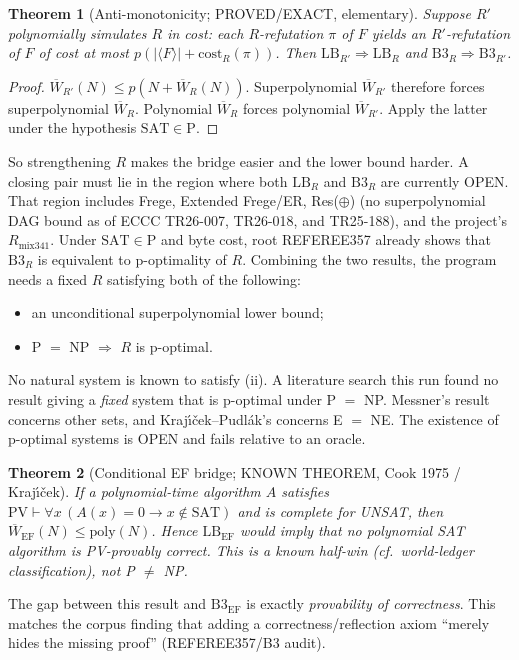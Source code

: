 \documentclass[11pt]{article}
\newtheorem{theorem}{Theorem}
\begin{document}
\begin{theorem}[Anti-monotonicity; PROVED/EXACT, elementary]
Suppose $R'$ polynomially simulates $R$ \emph{in cost}: each $R$-refutation
$\pi$ of $F$ yields an $R'$-refutation of $F$ of cost at most
$p(|\langle F\rangle|+\mathrm{cost}_R(\pi))$. Then
$\mathrm{LB}_{R'}\Rightarrow\mathrm{LB}_R$ and $\mathrm{B3}_R\Rightarrow\mathrm{B3}_{R'}$.
\end{theorem}
\begin{proof}
$\overline W_{R'}(N)\le p(N+\overline W_R(N))$. Superpolynomial $\overline W_{R'}$ therefore forces
superpolynomial $\overline W_R$. Polynomial $\overline W_R$ forces polynomial $\overline W_{R'}$.
Apply the latter under the hypothesis $\mathrm{SAT}\in\mathrm P$.
\end{proof}
\noindent So strengthening $R$ makes the bridge easier and the lower bound harder.
A closing pair must lie in the region where both $\mathrm{LB}_R$ and $\mathrm{B3}_R$ are
currently OPEN. That region includes Frege, Extended Frege/ER, Res($\oplus$)
(no superpolynomial DAG bound as of ECCC TR26-007, TR26-018, and TR25-188), and the
project's $R_{\mathrm{mix341}}$. Under $\mathrm{SAT}\in\mathrm P$ and byte cost,
root REFEREE357 already shows that $\mathrm{B3}_R$ is equivalent to p-optimality of $R$.
Combining the two results, the program needs a fixed $R$ satisfying both of the following:
\begin{itemize}
\item[(i)] an unconditional superpolynomial lower bound;
\item[(ii)] P $=$ NP $\Rightarrow$ $R$ is p-optimal.
\end{itemize}
No natural system is known to satisfy (ii). A literature search this run found no
result giving a \emph{fixed} system that is p-optimal under P $=$ NP. Messner's
result concerns other sets, and Kraj\'\i\v{c}ek--Pudl\'ak's concerns E $=$ NE. The
existence of p-optimal systems is OPEN and fails relative to an oracle.

\begin{theorem}[Conditional EF bridge; KNOWN THEOREM, Cook 1975 / Kraj\'\i\v{c}ek]
If a polynomial-time algorithm $A$ satisfies
$\mathrm{PV}\vdash\forall x\,(A(x)=0\rightarrow x\notin\mathrm{SAT})$ and is complete
for UNSAT, then $\overline W_{\mathrm{EF}}(N)\le\mathrm{poly}(N)$. Hence
$\mathrm{LB}_{\mathrm{EF}}$ would imply that no polynomial SAT algorithm is
PV-provably correct. This is a known half-win (cf.\ world-ledger
classification), not P $\neq$ NP.
\end{theorem}
\noindent The gap between this result and $\mathrm{B3}_{\mathrm{EF}}$ is exactly
\emph{provability of correctness}. This matches the corpus finding that adding a
correctness/reflection axiom ``merely hides the missing proof'' (REFEREE357/B3 audit).
\end{document}
